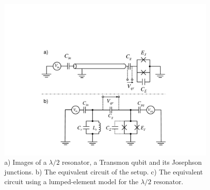 \begin{figure}
	\includegraphics[width=11cm]{"./material/figures/introduction/cqed/cqed"}
	\caption{a) Images of a $\lambda/2$ resonator, a Transmon qubit and its Josephson junctions. b) The equivalent circuit of the setup. c) The equivalent circuit using a lumped-element model for the $\lambda/2$ resonator.}
	\label{fig:CQED}
\end{figure}

